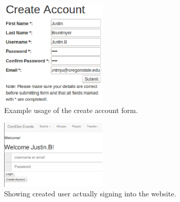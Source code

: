\documentclass[letterpaper,10pt,onecolumn]{IEEEtran} %
\begin{document}
\begin{enumerate}[label*=\arabic*.]

\end{enumerate}

\begin{figure}[htp]
  \begin{center}
  
  \includegraphics[width=2in]{createAccountForm}
  \centering
  \caption{Example usage of the create account form. }

  \end{center}
\end{figure}

\begin{figure}[htp]
  \begin{center}
  
  \includegraphics[width=2in]{loginSuccess}
  \centering
  \caption{Showing created user actually signing into the website. }

  \end{center}
\end{figure}
\end{document}
